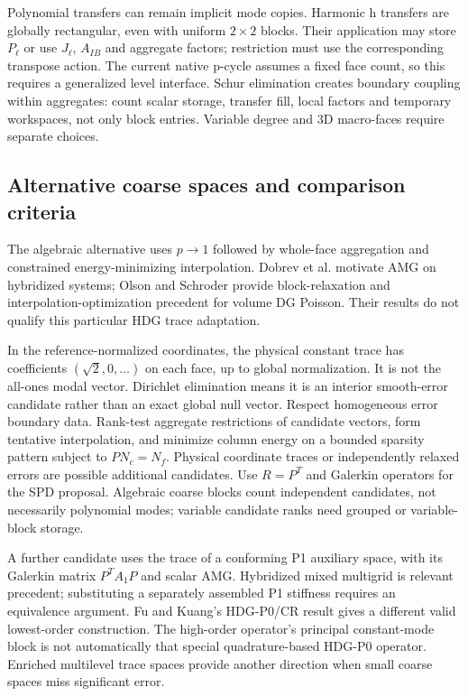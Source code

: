 \documentclass[11pt]{article}
\numberwithin{equation}{section}
\numberwithin{figure}{section}
\numberwithin{table}{section}
\begin{document}
Polynomial transfers can remain implicit mode copies. Harmonic h transfers
are globally rectangular, even with uniform $2\times2$ blocks. Their
application may store $P_\ell$ or use $J_\ell$, $A_{IB}$ and aggregate factors;
restriction must use the corresponding transpose action. The current native
p-cycle assumes a fixed face count, so this requires a generalized level
interface. Schur elimination creates boundary coupling within aggregates:
count scalar storage, transfer fill, local factors and temporary workspaces,
not only block entries. Variable degree and 3D macro-faces require separate
choices.

\subsection{Alternative coarse spaces and comparison criteria}
The algebraic alternative uses $p\to1$ followed by whole-face aggregation
and constrained energy-minimizing interpolation. Dobrev et al.
\cite{dobrev} motivate AMG on hybridized systems; Olson and Schroder
\cite{olson} provide block-relaxation and interpolation-optimization
precedent for volume DG Poisson. Their results do not qualify this particular
HDG trace adaptation.

In the reference-normalized coordinates, the physical constant trace has
coefficients $(\sqrt{2},0,\ldots)$ on each face, up to global normalization.
It is not the all-ones modal vector. Dirichlet elimination means it is an
interior smooth-error candidate rather than an exact global null vector.
Respect homogeneous error boundary data. Rank-test aggregate restrictions of
candidate vectors, form tentative interpolation, and minimize column energy
on a bounded sparsity pattern subject to $PN_c=N_f$. Physical coordinate
traces or independently relaxed errors are possible additional candidates.
Use $R=P^T$ and Galerkin operators for the SPD proposal. Algebraic coarse
blocks count independent candidates, not necessarily polynomial modes;
variable candidate ranks need grouped or variable-block storage.

A further candidate uses the trace of a conforming P1 auxiliary space,
with its Galerkin matrix $P^TA_1P$ and scalar AMG. Hybridized mixed multigrid
\cite{gopal} is relevant precedent; substituting a separately assembled
P1 stiffness requires an equivalence argument. Fu and Kuang's HDG-P0/CR
result \cite{fupzero} gives a different valid lowest-order construction.
The high-order operator's principal constant-mode block is not automatically
that special quadrature-based HDG-P0 operator. Enriched multilevel trace
spaces \cite{muralilevel} provide another direction when small coarse spaces
miss significant error.
\end{document}
